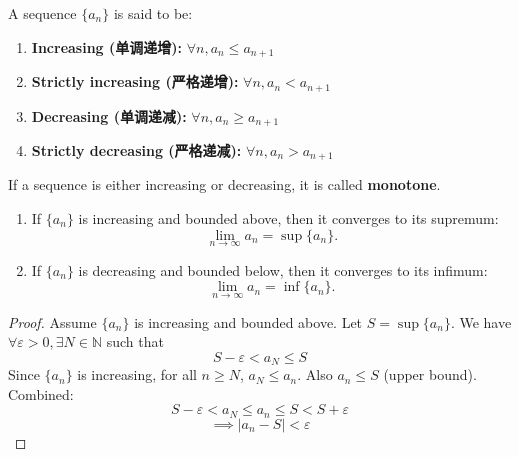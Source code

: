 \documentclass[
	UTF-8,
	11pt, %
	a4paper, %
]{LegrandOrangeBook}
\begin{document}
        \begin{definition}[Monotonicity]
        A sequence $\{a_n\}$ is said to be:
        \begin{enumerate}
            \item \textbf{Increasing (单调递增):} $\forall n, a_n \le a_{n+1}$
            \item \textbf{Strictly increasing (严格递增):} $\forall n, a_n < a_{n+1}$
            \item \textbf{Decreasing (单调递减):} $\forall n, a_n \ge a_{n+1}$
            \item \textbf{Strictly decreasing (严格递减):} $\forall n, a_n > a_{n+1}$
        \end{enumerate}
        If a sequence is either increasing or decreasing, it is called \textbf{monotone}.
        \end{definition}

        \begin{theorem}\quad
        \begin{enumerate}
            \item If $\{a_n\}$ is increasing and bounded above, then it converges to its supremum:
            \[ \lim_{n \to \infty} a_n = \sup \{a_n\}. \]
            \item If $\{a_n\}$ is decreasing and bounded below, then it converges to its infimum:
            \[ \lim_{n \to \infty} a_n = \inf \{a_n\}. \]
        \end{enumerate}
        \end{theorem}

        \begin{proof}
        Assume $\{a_n\}$ is increasing and bounded above. Let $S = \sup \{a_n\}$.
        We have $\forall \varepsilon > 0, \exists N \in \mathbb{N}$ such that 
        $$S - \varepsilon < a_N \le S$$
        Since $\{a_n\}$ is increasing, for all $n \ge N$, $a_N \le a_n$. Also $a_n \le S$ (upper bound).
        Combined:
        \[ S - \varepsilon < a_N \le a_n \le S < S + \varepsilon \]
        \[ \implies |a_n - S| < \varepsilon \]
        \end{proof}
\end{document}
